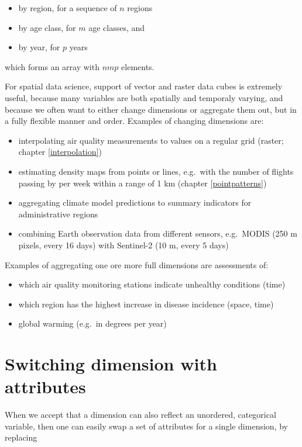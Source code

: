 \documentclass[]{book}
\providecommand{\tightlist}{%
  \setlength{\itemsep}{0pt}\setlength{\parskip}{0pt}}
\begin{document}
\begin{itemize}
\tightlist
\item
  by region, for a sequence of \(n\) regions
\item
  by age class, for \(m\) age classes, and
\item
  by year, for \(p\) years
\end{itemize}

which forms an array with \(n m p\) elements.

For spatial data science, support of vector and raster data cubes
is extremely useful, because many variables are both spatially
and temporaly varying, and because we often want to either change
dimensions or aggregate them out, but in a fully flexible manner
and order. Examples of changing dimensions are:

\begin{itemize}
\tightlist
\item
  interpolating air quality measurements to values on a regular grid (raster; chapter \ref{interpolation})
\item
  estimating density maps from points or lines, e.g.~with the number of flights passing by per week within a range of 1 km (chapter \ref{pointpatterns})
\item
  aggregating climate model predictions to summary indicators for administrative regions
\item
  combining Earth observation data from different sensors, e.g.~MODIS (250 m pixels, every 16 days) with Sentinel-2 (10 m, every 5 days)
\end{itemize}

Examples of aggregating one ore more full dimensions are assessments of:

\begin{itemize}
\tightlist
\item
  which air quality monitoring stations indicate unhealthy conditions (time)
\item
  which region has the highest increase in disease incidence (space, time)
\item
  global warming (e.g.~in degrees per year)
\end{itemize}

\hypertarget{switching}{%
\section{Switching dimension with attributes}\label{switching}}

When we accept that a dimension can also reflect an unordered,
categorical variable, then one can easily swap a set of attributes
for a single dimension, by replacing
\end{document}
